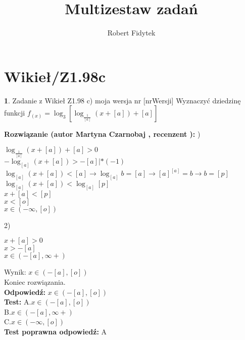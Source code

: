 \documentclass[12pt, a4paper]{article}
\title{Multizestaw zadań}
\author{Robert Fidytek}
\date{}
\theoremstyle{definition} %
\newtheorem{zad}{}
\newcommand{\kategoria}[1]{\section{#1}} %
\newcommand{\zadStart}[1]{\begin{zad}#1\newline} %
\newcommand{\zadStop}{\end{zad}}   %
\newcommand{\rozwStart}[2]{\noindent \textbf{Rozwiązanie (autor #1 , recenzent #2): }\newline} %
\newcommand{\rozwStop}{\newline}                                            %
\newcommand{\odpStart}{\noindent \textbf{Odpowiedź:}\newline}    %
\newcommand{\odpStop}{\newline}                                             %
\newcommand{\testStart}{\noindent \textbf{Test:}\newline} %
\newcommand{\testStop}{\newline} %
\newcommand{\kluczStart}{\noindent \textbf{Test poprawna odpowiedź:}\newline} %
\newcommand{\kluczStop}{\newline} %
\begin{document}
\maketitle


\kategoria{Wikieł/Z1.98c}
\zadStart{Zadanie z Wikieł Z1.98 c) moja wersja nr [nrWersji]}
Wyznaczyć dziedzinę funkcji $ f_{(x)} = \log_{3}[\log_{\frac{1}{[a]}} (x + [a]) +[a]] $\\
\zadStop
\rozwStart{Martyna Czarnobaj}{}
1)
\begin{center}
	$\log_{\frac{1}{[a]}} (x + [a]) +[a] > 0$\\
	$- \log_{[a]} (x + [a]) > - [a] |*(-1)$\\
	$ \log_{[a]} (x + [a]) < [a] \rightarrow \log_{[a]} b = [a] \rightarrow [a]^{[a]} = b \rightarrow b = [p]  $\\
	$ \log_{[a]} (x + [a]) < \log_{[a]} [p] $\\
	$ x + [a] < [p]$\\
	$ x < [o] $\\
	$ x \in (- \infty,[o]) $\\
\end{center}
2)
\begin{center}
	$ x + [a] > 0 $\\
	$ x > -[a] $\\
	$ x \in (-[a],\infty+) $\\
	
\end{center}
Wynik: $ x \in (-[a],[o]) $\\
Koniec rozwiązania.\\
\rozwStop
\odpStart
$ x \in (-[a],[o]) $ \\
\odpStop
\testStart
A.$ x \in (-[a],[o]) $ \\
B.$ x \in (-[a],\infty+) $ \\
C.$ x \in (- \infty,[o]) $ \\
\testStop
\kluczStart
A
\kluczStop
\end{document}
